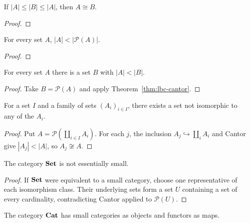 \begin{theorem}
\label{thm:lbc-cantor-bernstein}
If $|A|\le|B|\le|A|$, then $A\cong B$.
\notready
\end{theorem}
\begin{proof}
\notready
\end{proof}

\begin{theorem}[Cantor]
\label{thm:lbc-cantor}
For every set $A$, $|A|<|\mathcal P(A)|$.
\end{theorem}
\begin{proof}
\notready
\end{proof}

\begin{corollary}
\label{cor:lbc-unbounded-cardinality}
For every set $A$ there is a set $B$ with $|A|<|B|$.
\end{corollary}
\begin{proof}
Take $B=\mathcal P(A)$ and apply Theorem~\ref{thm:lbc-cantor}.
\end{proof}

\begin{proposition}
\label{prop:lbc-set-outside-family}
For a set $I$ and a family of sets $(A_i)_{i\in I}$, there exists a set not
isomorphic to any of the $A_i$.
\end{proposition}
\begin{proof}
Put $A=\mathcal P(\coprod_{i\in I}A_i)$. For each $j$, the inclusion
$A_j\hookrightarrow\coprod_iA_i$ and Cantor give $|A_j|<|A|$, so
$A_j\not\cong A$.
\end{proof}

\begin{proposition}
\label{prop:lbc-set-not-essentially-small}
The category $\mathbf{Set}$ is not essentially small.
\end{proposition}
\begin{proof}
If $\mathbf{Set}$ were equivalent to a small category, choose one representative of
each isomorphism class. Their underlying sets form a set $U$ containing a set
of every cardinality, contradicting Cantor applied to $\mathcal P(U)$.
\end{proof}

\begin{definition}
\label{def:lbc-cat}
The category $\mathbf{Cat}$ has small categories as objects and functors as maps.
\end{definition}
